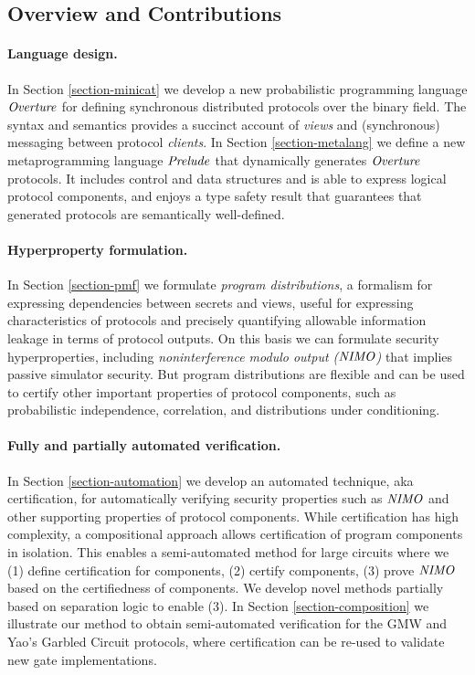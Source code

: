 \subsection{Overview and Contributions}

\paragraph{Language design.} In Section \ref{section-minicat} we
develop a new probabilistic programming language $\mathit{Overture}$ for
defining synchronous distributed protocols over the binary field. The
syntax and semantics provides a succinct account of \emph{views} and
(synchronous) messaging between protocol \emph{clients}. In Section
\ref{section-metalang} we define a new metaprogramming language
$\mathit{Prelude}$ that dynamically generates $\mathit{Overture}$ protocols. It
includes control and data structures and is able to express logical
protocol components, and enjoys a type safety result that guarantees
that generated protocols are semantically well-defined.

\paragraph{Hyperproperty formulation.} In Section \ref{section-pmf} we
formulate \emph{program distributions}, a formalism for expressing
dependencies between secrets and views, useful for expressing
characteristics of protocols and precisely quantifying allowable
information leakage in terms of protocol outputs. On this basis we can
formulate security hyperproperties, including \emph{noninterference
modulo output ($\mathit{NIMO}$)} that implies passive simulator security. But
program distributions are flexible and can be used to certify other
important properties of protocol components, such as probabilistic
independence, correlation, and distributions under conditioning.

\paragraph{Fully and partially automated verification.} In Section
\ref{section-automation} we develop an automated technique, aka
certification, for automatically verifying security properties such as
$\mathit{NIMO}$ and other supporting properties of protocol components.  While
certification has high complexity, a compositional approach allows
certification of program components in isolation.  This enables a
semi-automated method for large circuits where we (1) define
certification for components, (2) certify components, (3) prove
$\mathit{NIMO}$ based on the certifiedness of components. We develop novel
methods partially based on separation logic
\cite{barthe2019probabilistic} to enable (3).  In Section
\ref{section-composition} we illustrate our method to obtain
semi-automated verification for the GMW and Yao's Garbled
Circuit protocols, where certification can be re-used to validate new
gate implementations.

